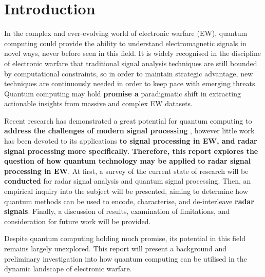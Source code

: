 \section{Introduction}
\label{sec:introduction}

In the complex and ever-evolving world of electronic warfare (EW), quantum computing could provide the ability to understand electromagnetic signals in novel ways, never before seen in this field. 
It is widely recognised in the discipline of electronic warfare that traditional signal analysis techniques are still bounded by computational constraints, so in order to maintain strategic advantage, new techniques are continuously needed in order to keep pace with emerging threats. 
Quantum computing may hold 
\textbf{promise a} paradigmatic shift 
in extracting actionable insights from massive and complex EW datasets. 

Recent research has demonstrated a great potential for quantum computing to 
\textbf{address the challenges of modern signal processing}
\textbf{\cite{}}, 
however little work has been devoted to its applications \textbf{to signal processing in EW, and radar signal processing more specifically}. 
\textbf{Therefore, this report explores the question of how quantum technology may be applied} 
\textbf{to radar signal processing in EW}. 
At first, a survey of the current state of research will be \textbf{conducted} for radar signal analysis and quantum signal processing. 
Then, an empirical inquiry into the subject will be presented, aiming to determine 
how quantum methods can be used to encode, characterise, and de-interleave \textbf{radar signals}. 
Finally, a discussion of results, examination of limitations, and consideration for future work will be provided. 
 
Despite quantum computing holding much promise, its potential in this field remains largely unexplored. This report will present a background and preliminary investigation into how quantum computing can be utilised in the dynamic landscape of electronic warfare. 

